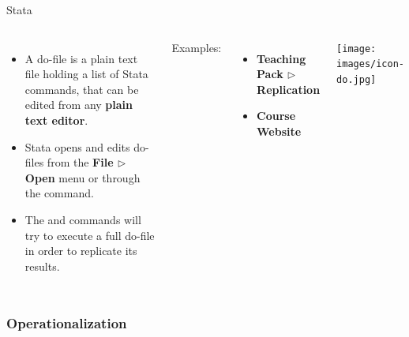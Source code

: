 \documentclass{beamer}
\begin{document}
	\begin{frame}[t]{Stata }
		\begin{columns}[T]
			\begin{itemize}
				\item A do-file is a plain text file holding a list of Stata commands, that can be edited from any \textbf{plain text editor}.
				
				\item Stata opens and edits do-files from the \textbf{File $\triangleright$ Open} menu or through the  command.
				
				\item The  and  commands will try to execute a full do-file in order to replicate its results.
				
			\end{itemize}
						
			Examples:
			
			\begin{itemize}
				\item \textbf{Teaching Pack $\triangleright$ Replication}

				\item \textbf{Course Website}		
			\end{itemize}

			\texttt{[image: images/icon-do.jpg]}
		\end{columns}
	\end{frame}

	
	\subsubsection{Operationalization}
	
\end{document}
